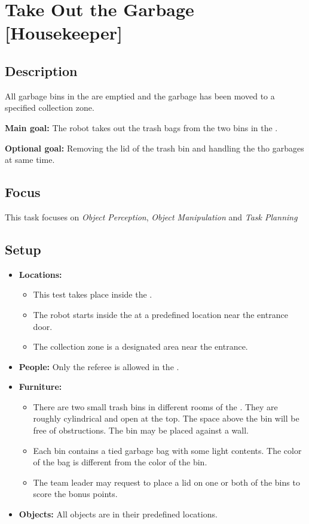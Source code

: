 \section{Take Out the Garbage [Housekeeper]}
\label{test:take-out-the-garbage}

\subsection*{Description}
	All garbage bins in the \Arena{} are emptied and the garbage has been moved to a specified collection zone.

\textbf{Main goal:}
	The robot takes out the trash bags from the two bins in the \Arena{}.

\textbf{Optional goal:}
	Removing the lid of the trash bin and handling the tho garbages at same time.

\subsection*{Focus}
	This task focuses on 
	\textit{Object Perception},
	\textit{Object Manipulation} and
	\textit{Task Planning}

\subsection*{Setup}
\begin{itemize}[nosep]	
	\item \textbf{Locations:}
		\begin{itemize}
			\item This test takes place inside the \Arena{}.
			\item The robot starts inside the \Arena{} at a predefined location near the entrance door.
			\item The collection zone is a designated area near the entrance.
		\end{itemize}
	\item \textbf{People:} Only the referee is allowed in the \Arena{}.
	\item \textbf{Furniture:} 
		\begin{itemize}
			\item There are two small trash bins in different rooms of the \Arena{}. They are roughly cylindrical and open at the top. The space above the bin will be free of obstructions. The bin may be placed against a wall.
			\item Each bin contains a tied garbage bag with some light contents. The color of the bag is different from the color of the bin.
			\item The team leader may request to place a lid on one or both of the bins to score the bonus points.
		\end{itemize}
	\item \textbf{Objects:} All objects are in their predefined locations.
\end{itemize}

